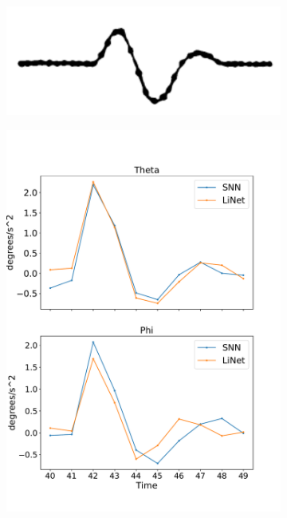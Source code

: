 \documentclass [MS] {UCLAthesis}
\begin{document}
\begin{figure}
    \centering

    \begin{subfigure}{0.2\textwidth}
        \centering
        \includegraphics[width=\textwidth]{saccade_human_acc}
        \caption{}
        \label{fig:saccade_human_acc}
    \end{subfigure}
    \hfill
    \begin{subfigure}{0.2\textwidth}
        \centering
        \includegraphics[width=\textwidth]{saccade_human_acc_normal}

\end{subfigure}
\end{figure}
\end{document}

